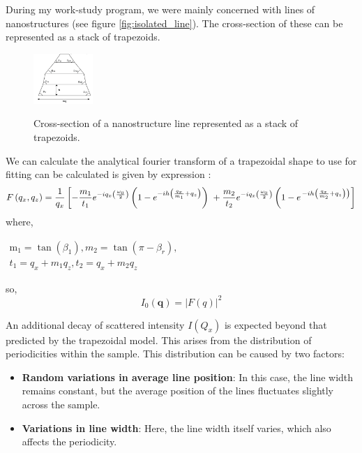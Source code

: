 \medskip

During my work-study program, we were mainly concerned with lines of nanostructures (see figure \ref{fig:isolated_line}). The cross-section of
these can be represented as a stack of trapezoids.
\begin{figure}[h]
    \centering
    \includegraphics[width=0.2\textwidth]{images/trapezoid.png}
    \label{fig:trapezoid_model}
    \caption{Cross-section of a nanostructure line represented as a stack of trapezoids.}
    
\end{figure}
We can calculate the analytical fourier transform of a trapezoidal shape to use for fitting
can be calculated is given by expression \cite{sunday_2015}:
\begin{equation}
    F\left(q_{x}, q_{z}\right)=\frac{1}{q_{x}}\left[-\frac{m_{1}}{t_{1}} e^{-i q_{x}\left(\frac{\omega_{0}}{2}\right)}\left(1-e^{-i h\left(\frac{q_{x}}{m_{1}}+q_{z}\right)}\right)\right. \\ +\frac{m_{2}}{t_{2}} e^{-i q_{x}\left(\frac{\omega_{0}}{2}\right)}\left(1-e^{\left.-i h\left(\frac{q_{x}}{m_{2}}+q_{z}\right)\right)}\right]
    \label{eq:trapezoidal_ft}
\end{equation}
where,

\( \begin{array}{l}\mathrm{m}_{1}=\tan \left(\beta_{1}\right) , m_{2}=\tan \left(\pi-\beta_{r}\right), \\ t_{1}= q_{x}+m_{1} q_{z}, t_{2}= q_{x}+m_{2} q_{z}\end{array} \)

\medskip

so,
\begin{equation}
    I_{0}(\mathbf{q}) = |F(q)|^{2}
\end{equation}

An additional decay of scattered intensity $I(Q_{x})$ is expected beyond that predicted by the trapezoidal model.
This arises from the distribution of periodicities within the sample. This distribution 
can be caused by two factors:
\begin{itemize}
    \item \textbf{Random variations in average line position}: In this case, the line width remains
         constant, but the average position of the lines fluctuates slightly across the 
         sample.
    \item \textbf{Variations in line width}: Here, the line width itself varies, 
        which also affects the periodicity.
\end{itemize}

